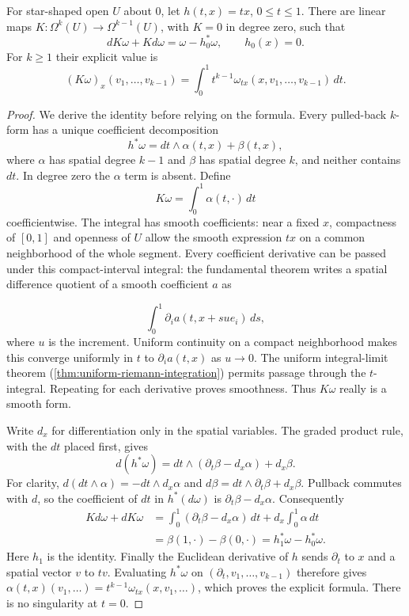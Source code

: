 \begin{lemma}\label{lem:segment-homotopy}
For star-shaped open $U$ about $0$, let $h(t,x)=tx$, $0\leq t\leq1$.
There are linear maps $K:\Omega^k(U)\to\Omega^{k-1}(U)$, with $K=0$
in degree zero, such that
\[
dK\omega+Kd\omega=\omega-h_0^*\omega,\qquad h_0(x)=0.
\]
For $k\geq1$ their explicit value is
\[
(K\omega)_x(v_1,\ldots,v_{k-1})
=\int_0^1 t^{k-1}\omega_{tx}(x,v_1,\ldots,v_{k-1})\,dt.
\]
\end{lemma}
\begin{proof}
We derive the identity before relying on the formula. Every pulled-back
$k$-form has a unique coefficient decomposition
\[
h^*\omega=dt\wedge\alpha(t,x)+\beta(t,x),
\]
where $\alpha$ has spatial degree $k-1$ and $\beta$ has spatial degree
$k$, and neither contains $dt$. In degree zero the $\alpha$ term is
absent. Define
\[
K\omega=\int_0^1\alpha(t,\cdot)\,dt
\]
 coefficientwise.
The integral has smooth coefficients: near a fixed $x$, compactness of
$[0,1]$ and openness of $U$ allow the smooth expression $tx$ on a common
neighborhood of the whole segment. Every coefficient derivative can be
passed under this compact-interval integral: the fundamental theorem writes
a spatial difference quotient of a smooth coefficient $a$ as

\[
\int_0^1\partial_i a(t,x+su e_i)\,ds,
\]
 where $u$ is the increment.
Uniform continuity on a compact neighborhood makes this converge uniformly
in $t$ to $\partial_i a(t,x)$ as $u\to0$. The uniform integral-limit theorem
(\cref{thm:uniform-riemann-integration})
permits passage through the $t$-integral. Repeating for each derivative
proves smoothness. Thus $K\omega$ really is a smooth form.

Write $d_x$ for differentiation only in the spatial variables. The
graded product rule, with the $dt$ placed first, gives
\[
d(h^*\omega)=dt\wedge(\partial_t\beta-d_x\alpha)+d_x\beta.
\]
For clarity, $d(dt\wedge\alpha)=-dt\wedge d_x\alpha$ and
$d\beta=dt\wedge\partial_t\beta+d_x\beta$. Pullback commutes with
$d$, so the coefficient of $dt$ in $h^*(d\omega)$ is
$\partial_t\beta-d_x\alpha$. Consequently
\[
\begin{aligned}
Kd\omega+dK\omega
&=\int_0^1(\partial_t\beta-d_x\alpha)\,dt
  +d_x\int_0^1\alpha\,dt\\
&=\beta(1,\cdot)-\beta(0,\cdot)
=h_1^*\omega-h_0^*\omega.
\end{aligned}
\]
Here $h_1$ is the identity. Finally the Euclidean derivative of $h$ sends
$\partial_t$ to $x$ and a spatial vector $v$ to $tv$.
Evaluating $h^*\omega$ on $(\partial_t,v_1,\ldots,v_{k-1})$ therefore
gives $\alpha(t,x)(v_1,\ldots)=t^{k-1}\omega_{tx}(x,v_1,\ldots)$,
which proves the explicit formula. There is no singularity at $t=0$.
\end{proof}

